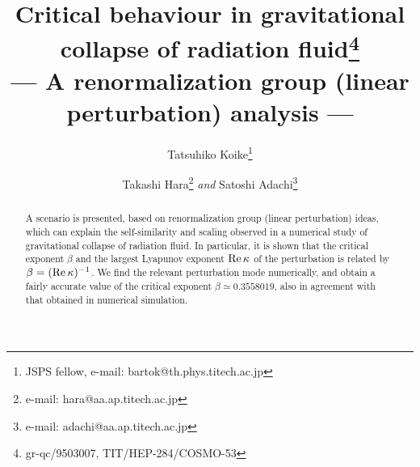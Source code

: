 
%
%
%
%
%
%
\HideDisplacementBoxes %
 \SetRokickiEPSFSpecial %
%




\draft
{}

\title{Critical behaviour in gravitational collapse of radiation
fluid\thanks{gr-qc/9503007, TIT/HEP-284/COSMO-53} \\
--- A renormalization group (linear perturbation) analysis ---}
\author{Tatsuhiko Koike\thanks{JSPS fellow,
e-mail: bartok@th.phys.titech.ac.jp}}
\address{Department of Physics, Tokyo Institute of Technology,
Oh-Okayama, Meguro, Tokyo 152, Japan}
\author{Takashi Hara\thanks{e-mail: hara@aa.ap.titech.ac.jp}
{\em and} Satoshi Adachi\thanks{e-mail: adachi@aa.ap.titech.ac.jp}}
\address{Department of Applied Physics, Tokyo Institute of Technology,
Oh-Okayama, Meguro, Tokyo 152, Japan}

\maketitle

\begin{abstract}
A scenario is presented, based on renormalization group (linear
perturbation) ideas,  which can explain the self-similarity and scaling
observed in a numerical study of
gravitational collapse of radiation fluid.
In particular, it is shown that the critical exponent $\beta$ and the
largest Lyapunov exponent ${\rm Re\, } \kappa$ of
the perturbation is related by
$\beta= ({\rm Re\, } \kappa) ^{-1}$.
We find the relevant
perturbation mode numerically, and obtain a fairly accurate
value of the critical
exponent $\beta \simeq 0.3558019$, also in agreement with that
obtained in numerical simulation.
\end{abstract}

